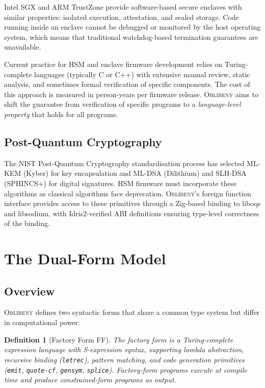 \documentclass[11pt,a4paper]{article}
\newtheorem{definition}[theorem]{Definition}
\newcommand{\obl}{\textsc{Obl\'{i}ben\'{y}}}
\newcommand{\ffform}{\textsf{FF}}
\begin{document}
Intel SGX \citep{costan2016intel} and ARM TrustZone \citep{pinto2019demystifying}
provide software-based secure enclaves with similar
properties: isolated execution, attestation, and sealed storage.  Code running
inside an enclave cannot be debugged or monitored by the host operating
system, which means that traditional watchdog-based termination guarantees
are unavailable.

Current practice for HSM and enclave firmware development relies on
Turing-complete languages (typically C or C++) with extensive manual review,
static analysis, and sometimes formal verification of specific components.
The cost of this approach is measured in person-years per firmware release.
\obl{} aims to shift the guarantee from verification of specific programs to
a \emph{language-level property} that holds for all programs.

\subsection{Post-Quantum Cryptography}

The NIST Post-Quantum Cryptography standardisation process
\citep{nist2024pqc} has selected ML-KEM (Kyber) for key encapsulation and
ML-DSA (Dilithium) and SLH-DSA (SPHINCS+) for digital signatures.  HSM
firmware must incorporate these algorithms as classical algorithms face
deprecation.  \obl{}'s foreign function interface provides access to these
primitives through a Zig-based binding to liboqs \citep{stebila2024liboqs}
and libsodium, with Idris2-verified ABI definitions ensuring type-level
correctness of the binding.


\section{The Dual-Form Model}
\label{sec:dual-form}

\subsection{Overview}

\obl{} defines two syntactic forms that share a common type system but differ
in computational power:

\begin{definition}[Factory Form \ffform{}]
The \emph{factory form} is a Turing-complete expression language with
S-expression syntax, supporting lambda abstraction, recursive binding
(\texttt{letrec}), pattern matching, and code generation primitives
(\texttt{emit}, \texttt{quote-cf}, \texttt{gensym}, \texttt{splice}).
Factory-form programs execute at compile time and produce constrained-form
programs as output.
\end{definition}
\end{document}
